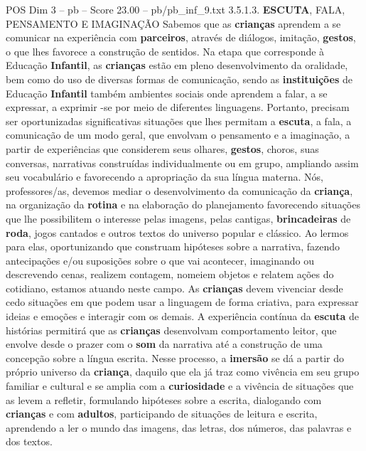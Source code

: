 \begin{textsample}{POS Dim 3 – pb – Score 23.00 – pb/pb\_inf\_9.txt}  \label{ex:f3_pos_085}
3.5.1.3. \textbf{ESCUTA}, FALA, PENSAMENTO E IMAGINAÇÃO Sabemos que as \textbf{crianças} aprendem a se comunicar na experiência com \textbf{parceiros}, através de diálogos, imitação, \textbf{gestos}, o que lhes favorece a construção de sentidos.
Na etapa que corresponde à Educação \textbf{Infantil}, as \textbf{crianças} estão em pleno desenvolvimento da oralidade, bem como do uso de diversas formas de comunicação, sendo as \textbf{instituições} de Educação \textbf{Infantil} também ambientes sociais onde aprendem a falar, a se expressar, a exprimir -se por meio de diferentes linguagens.
Portanto, precisam ser oportunizadas significativas situações que lhes permitam a \textbf{escuta}, a fala, a comunicação de um modo geral, que envolvam o pensamento e a imaginação, a partir de experiências que considerem seus olhares, \textbf{gestos}, choros, suas conversas, narrativas construídas individualmente ou em grupo, ampliando assim seu vocabulário e favorecendo a apropriação da sua língua materna.
Nós, professores/as, devemos mediar o desenvolvimento da comunicação da \textbf{criança}, na organização da \textbf{rotina} e na elaboração do planejamento favorecendo situações que lhe possibilitem o interesse pelas imagens, pelas cantigas, \textbf{brincadeiras} de \textbf{roda}, jogos cantados e outros textos do universo popular e clássico.
Ao lermos para elas, oportunizando que construam hipóteses sobre a narrativa, fazendo antecipações e/ou suposições sobre o que vai acontecer, imaginando ou descrevendo cenas, realizem contagem, nomeiem objetos e relatem ações do cotidiano, estamos atuando neste campo.
As \textbf{crianças} devem vivenciar desde cedo situações em que podem usar a linguagem de forma criativa, para expressar ideias e emoções e interagir com os demais.
A experiência contínua da \textbf{escuta} de histórias permitirá que as \textbf{crianças} desenvolvam comportamento leitor, que envolve desde o prazer com o \textbf{som} da narrativa até a construção de uma concepção sobre a língua escrita.
Nesse processo, a \textbf{imersão} se dá a partir do próprio universo da \textbf{criança}, daquilo que ela já traz como vivência em seu grupo familiar e cultural e se amplia com a \textbf{curiosidade} e a vivência de situações que as levem a refletir, formulando hipóteses sobre a escrita, dialogando com \textbf{crianças} e com \textbf{adultos}, participando de situações de leitura e escrita, aprendendo a ler o mundo das imagens, das letras, dos números, das palavras e dos textos.

\end{textsample}
